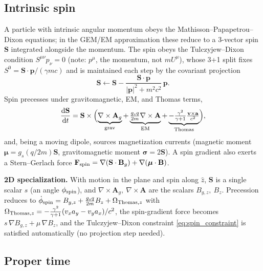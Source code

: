 \documentclass[11pt]{article}
\newcommand{\Ag}{\mathbf{A}_g}             %
\newcommand{\vv}[1]{\mathbf{#1}}           %
\newcommand{\dd}{\mathrm{d}}               %
\newcommand{\Bg}{\vv{B}_g}
\begin{document}
\subsection{Intrinsic spin}
\label{sec:spin}

A particle with intrinsic angular momentum obeys the
Mathisson--Papapetrou--Dixon equations; in the GEM/EM approximation these reduce
to a 3-vector spin $\vv{S}$ integrated alongside the momentum.  The spin obeys
the Tulczyjew--Dixon condition $S^{\mu\nu}p_\nu=0$ (note: $p^\mu$, the momentum,
not $mU^\mu$), whose 3+1 split fixes $S^0=\vv{S}\cdot\vv{p}/(\gamma m c)$ and is
maintained each step by the covariant projection
\begin{equation}
\label{eq:spin_constraint}
  \vv{S}\leftarrow \vv{S} - \frac{\vv{S}\cdot\vv{p}}{|\vv{p}|^2+m^2c^2}\,\vv{p}.
\end{equation}
Spin precesses under gravitomagnetic, EM, and Thomas terms,
\begin{equation}
\label{eq:precession_rates}
  \frac{\dd\vv{S}}{\dd t} = \vv{S}\times\Bigl(
     \underbrace{\nabla\times\Ag}_{\rm grav}
   + \underbrace{\tfrac{g_s q}{2m}\nabla\times\vv{A}}_{\rm EM}
   + \underbrace{-\tfrac{\gamma^2}{\gamma+1}\tfrac{\vv{v}\times\vv{a}}{c^2}}_{\rm Thomas}\Bigr),
\end{equation}
and, being a moving dipole, sources magnetization currents (magnetic moment
$\boldsymbol\mu=g_s(q/2m)\vv{S}$, gravitomagnetic moment $\boldsymbol\sigma =
2\vv{S}$). A spin gradient also exerts a Stern--Gerlach force
$\vv{F}_{\rm spin}=\nabla(\vv{S}\cdot\Bg)+\nabla(\boldsymbol\mu\cdot\vv{B})$.

\begin{twoD}
\textbf{2D specialization.} With motion in the plane and spin along $\hat z$,
$\vv{S}$ is a single scalar $s$ (an angle $\phi_{\rm spin}$), and
$\nabla\times\Ag,\ \nabla\times\vv{A}$ are the scalars $B_{g,z},\ B_z$.
Precession reduces to
$\dot\phi_{\rm spin}=B_{g,z}+\tfrac{g_s q}{2m}B_z+\Omega_{{\rm Thomas},z}$
with $\Omega_{{\rm Thomas},z}=-\tfrac{\gamma^2}{\gamma+1}(v_xa_y-v_ya_x)/c^2$,
the spin-gradient force becomes $s\,\nabla B_{g,z}+\mu\,\nabla B_z$, and the
Tulczyjew--Dixon constraint \eqref{eq:spin_constraint} is satisfied
automatically (no projection step needed).
\end{twoD}

\subsection{Proper time}
\label{sec:proptime}
\end{document}
